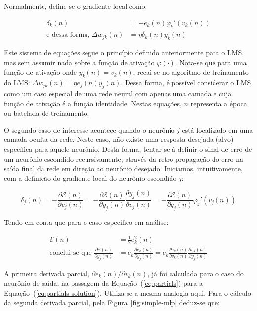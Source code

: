 Normalmente, define-se o gradiente local como:

\begin{align}
\delta_k(n) &= - e_k(n)\varphi_{k}'(v_k(n)) \\
\text{e dessa forma, } \Delta w_{jk}(n) &= \eta\delta_k(n)y_{k}(n)
\label{eq:neural-train}
\end{align}

Este sistema de equações segue o princípio definido anteriormente para o LMS,
mas sem assumir nada sobre a função de ativação $\varphi(\cdot)$. Nota-se que
para uma função de ativação onde $y_k(n) = v_k(n)$, recai-se no algoritmo de
treinamento do LMS: $\Delta w_{jk}(n) = \eta e_{j}(n)y_{j}(n)$. Dessa forma, é
possível considerar o LMS como um caso especial de uma rede neural com apenas
uma camada e cuja função de ativação é a função identidade. Nestas equações,
$n$ representa a época ou batelada de treinamento.

O segundo caso de interesse acontece quando o neurônio $j$ está localizado em
uma camada oculta da rede. Neste caso, não existe uma resposta desejada (alvo)
específica para aquele neurônio. Desta forma, tentar-se-á definir o sinal de
erro de um neurônio escondido recursivamente, através da retro-propagação do
erro na saída final da rede em direção ao neurônio desejado. Iniciamos,
intuitivamente, com a definição do gradiente local do neurônio escondido $j$:

\begin{equation}
\delta_j(n) = -\frac{\partial\mathcal{E}(n)}{\partial
v_j(n)} = -\frac{\partial\mathcal{E}(n)}{\partial
y_j(n)}\frac{\partial y_j(n)}{\partial v_j(n)} =
-\frac{\partial\mathcal{E}(n)}{\partial y_j(n)}\varphi_{j}'(v_j(n))
\end{equation}

Tendo em conta que para o caso específico em análise:

\begin{align}
\mathcal{E}(n) &= \frac{1}{2}e_{k}^{2}(n) \\
\text{conclui-se que } \frac{\partial\mathcal{E}(n)}{\partial y_j(n)} &=
e_{k}\frac{\partial e_k(n)}{\partial y_j(n)} = e_{k}\frac{\partial
e_k(n)}{\partial v_k(n)}\frac{\partial v_k(n)}{\partial y_j(n)}
\end{align}

A primeira derivada parcial, $\partial e_k(n)/\partial v_k(n)$, já foi
calculada para o caso do neurônio de saída, na passagem da
Equação~(\ref{eq:partials}) para a
Equação~(\ref{eq:partials-solution}). Utiliza-se a mesma analogia aqui. Para o
cálculo da segunda derivada parcial, pela Figura~\ref{fig:simple-mlp}
deduz-se que:

